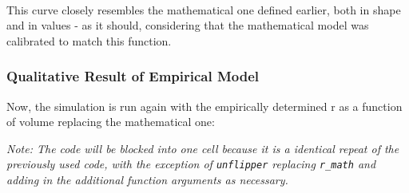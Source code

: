 \documentclass[11pt]{article}
\begin{document}
    \begin{center}
    \end{center}
    { \hspace*{\fill} \\}
    
    This curve closely resembles the mathematical one defined earlier, both
in shape and in values - as it should, considering that the mathematical
model was calibrated to match this function.

    \hypertarget{qualitative-result-of-empirical-model}{%
\subsubsection{Qualitative Result of Empirical
Model}\label{qualitative-result-of-empirical-model}}

Now, the simulation is run again with the empirically determined r as a
function of volume replacing the mathematical one:

\emph{Note: The code will be blocked into one cell because it is a
identical repeat of the previously used code, with the exception of
\texttt{unflipper} replacing \texttt{r\_math} and adding in the
additional function arguments as necessary.}
\end{document}
